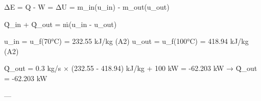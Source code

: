 ΔE = Q - W = ΔU = m_in(u_in) - m_out(u_out)  

Q̇_in + Q̇_out = ṁ(u_in - u_out)  

u_in = u_f(70°C) = 232.55 kJ/kg (A2)  
u_out = u_f(100°C) = 418.94 kJ/kg (A2)  

Q̇_out = 0.3 kg/s × (232.55 - 418.94) kJ/kg + 100 kW  
= -62.203 kW → Q̇_out = -62.203 kW  

---